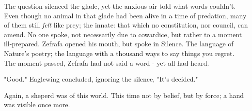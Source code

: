 




The question silenced the glade, yet the anxious air told what words couldn't. Even though no animal in that glade had been alive in a time of predation, many of them still \textit{felt} like prey; the innate: that which no constitution, nor council, can amend.
No one spoke, not necessarily due to cowardice, but rather to a moment ill-prepared.
  Zefrafa opened his mouth, but spoke in Silence. The language of Nature's poetry; the language with a thousand ways to say things you regret.
The moment passed, Zefrafa had not said a word - yet all had heard. 

"Good." Eaglewing concluded, ignoring the silence, "It's decided."  %

Again, a sheperd was of this world. This time not by belief, but by force; a hand was visible once more.



